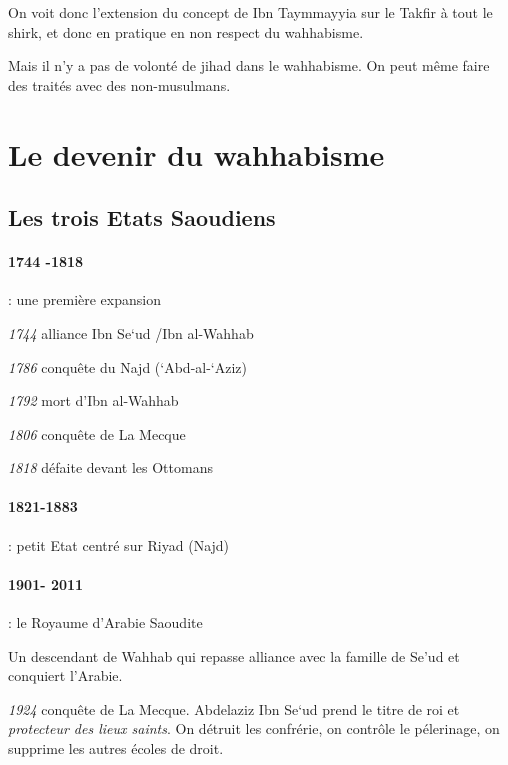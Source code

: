   \begin{Synthesis}
  On voit donc l'extension du concept de Ibn Taymmayyia sur le Takfir à tout le shirk, et donc en pratique en non respect du wahhabisme.
  \end{Synthesis}
 
 Mais il n'y a pas de volonté de jihad dans le wahhabisme. On peut même faire des traités avec des non-musulmans.
 
  \section{Le devenir du wahhabisme} 
 
  
 

\subsection{Les trois Etats Saoudiens} 

 
  {\paragraph{1744 -1818}: une première expansion}
 
 
\emph{1744} alliance Ibn Se`ud /Ibn al-Wahhab
 
\emph{1786} conquête du Najd (`Abd-al-`Aziz)
 
\emph{1792} mort d'Ibn al-Wahhab
 
\emph{1806} conquête de La Mecque
 
\emph{1818} défaite devant les Ottomans
 

 
  {\paragraph{1821-1883}: petit Etat centré sur Riyad (Najd)}
 
  {\paragraph{1901- 2011} : le Royaume d'Arabie Saoudite} Un descendant de Wahhab qui repasse alliance avec la famille de Se'ud et conquiert l'Arabie. 
 
 
\emph{1924} conquête de La Mecque. Abdelaziz Ibn Se`ud prend le titre de
roi et \textit{protecteur des lieux saints}. On détruit les confrérie, on contrôle le pélerinage, on supprime les autres écoles de droit.


